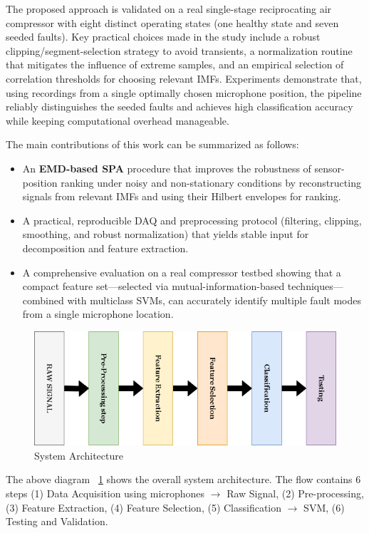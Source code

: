 \documentclass[12pt,a4paper]{article}
\begin{document}
The proposed approach is validated on a real single-stage reciprocating air compressor with eight distinct operating states (one healthy state and seven seeded faults). Key practical choices made in the study include a robust clipping/segment-selection strategy to avoid transients, a normalization routine that mitigates the influence of extreme samples, and an empirical selection of correlation thresholds for choosing relevant IMFs. Experiments demonstrate that, using recordings from a single optimally chosen microphone position, the pipeline reliably distinguishes the seeded faults and achieves high classification accuracy while keeping computational overhead manageable.

The main contributions of this work can be summarized as follows:
\begin{itemize}
  \item An \textbf{EMD-based SPA} procedure that improves the robustness of sensor-position ranking under noisy and non-stationary conditions by reconstructing signals from relevant IMFs and using their Hilbert envelopes for ranking.
  \item A practical, reproducible DAQ and preprocessing protocol (filtering, clipping, smoothing, and robust normalization) that yields stable input for decomposition and feature extraction.
  \item A comprehensive evaluation on a real compressor testbed showing that a compact feature set—selected via mutual-information-based techniques—combined with multiclass SVMs, can accurately identify multiple fault modes from a single microphone location.
\end{itemize}
\begin{figure}[H]
    \centering
    \includegraphics[width=1\linewidth]{Diagrams/icbmintro.drawio.png}
    \caption{System Architecture}
    \label{fig:sysarch}
\end{figure}
The above diagram ~\ref{fig:sysarch} shows the overall system architecture. The flow contains 6 steps (1) Data Acquisition using microphones $\rightarrow$ Raw Signal, (2) Pre-processing, (3) Feature Extraction, (4) Feature Selection, (5) Classification $\rightarrow$ SVM, (6) Testing and Validation.
\end{document}
